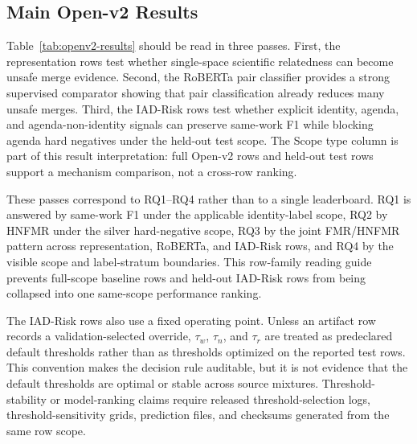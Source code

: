\documentclass[11pt]{article}
\begin{document}
\subsection{Main Open-v2 Results}

Table~\ref{tab:openv2-results} should be read in three passes. First, the representation rows test whether single-space scientific relatedness can become unsafe merge evidence. Second, the RoBERTa pair classifier provides a strong supervised comparator showing that pair classification already reduces many unsafe merges. Third, the IAD-Risk rows test whether explicit identity, agenda, and agenda-non-identity signals can preserve same-work F1 while blocking agenda hard negatives under the held-out test scope. The Scope type column is part of this result interpretation: full Open-v2 rows and held-out test rows support a mechanism comparison, not a cross-row ranking.

These passes correspond to RQ1--RQ4 rather than to a single leaderboard. RQ1 is answered by same-work F1 under the applicable identity-label scope, RQ2 by HNFMR under the silver hard-negative scope, RQ3 by the joint FMR/HNFMR pattern across representation, RoBERTa, and IAD-Risk rows, and RQ4 by the visible scope and label-stratum boundaries. This row-family reading guide prevents full-scope baseline rows and held-out IAD-Risk rows from being collapsed into one same-scope performance ranking.

The IAD-Risk rows also use a fixed operating point. Unless an artifact row records a validation-selected override, $\tau_w$, $\tau_n$, and $\tau_r$ are treated as predeclared default thresholds rather than as thresholds optimized on the reported test rows. This convention makes the decision rule auditable, but it is not evidence that the default thresholds are optimal or stable across source mixtures. Threshold-stability or model-ranking claims require released threshold-selection logs, threshold-sensitivity grids, prediction files, and checksums generated from the same row scope.
\end{document}
